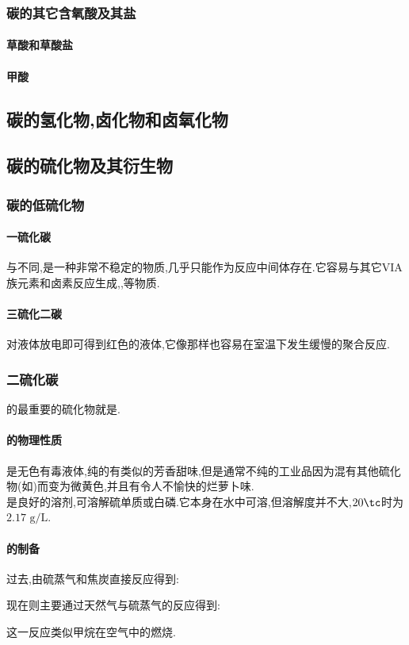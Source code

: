 \documentclass{ctexart}
\begin{document}
\subsubsection{碳的其它含氧酸及其盐}
\paragraph{草酸和草酸盐}
\paragraph{甲酸}
\subsection{碳的氢化物,卤化物和卤氧化物}
\subsection{碳的硫化物及其衍生物}
\subsubsection{碳的低硫化物}
\paragraph{一硫化碳}
与不同,是一种非常不稳定的物质,几乎只能作为反应中间体存在.它容易与其它VIA族元素和卤素反应生成,,等物质.
\paragraph{三硫化二碳}
对液体放电即可得到红色的液体,它像那样也容易在室温下发生缓慢的聚合反应.
\subsubsection{二硫化碳}
的最重要的硫化物就是.
\paragraph{的物理性质}
是无色有毒液体,纯的有类似的芳香甜味,但是通常不纯的工业品因为混有其他硫化物(如)而变为微黄色,并且有令人不愉快的烂萝卜味.\\
\indent {}是良好的溶剂,可溶解硫单质或白磷.它本身在水中可溶,但溶解度并不大,$20\tc$时为$2.17\text{ g/L}$.
\paragraph{的制备}
过去,由硫蒸气和焦炭直接反应得到:
\begin{center}
\end{center}
现在则主要通过天然气与硫蒸气的反应得到:
\begin{center}
\end{center}
这一反应类似甲烷在空气中的燃烧.
\end{document}

